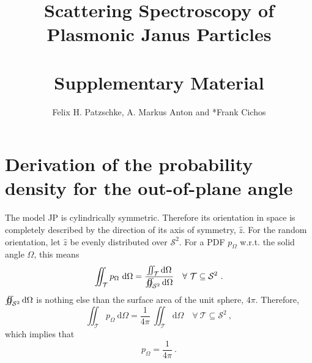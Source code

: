 \documentclass[10pt]{article}
\title{\sffamily\bfseries\color{MidnightBlue} Scattering Spectroscopy of\\Plasmonic Janus Particles\\\mbox{ }\\Supplementary Material}
\author{Felix H. Patzschke, A. Markus Anton and *Frank Cichos}
\date{}
\begin{document}

\maketitle

\sectionfont{\sffamily\color{MidnightBlue}}  %
\subsectionfont{\sffamily\color{MidnightBlue}}  %



\section*{Derivation of the probability density for the out-of-plane angle}

The model JP is cylindrically symmetric. Therefore its orientation in space is completely described by the direction of its axis of symmetry, $\hat{z}$. 
For the random orientation, let $\hat{z}$ be evenly distributed over $\mathcal{S}^2$. 
For a PDF $p_\Omega$ w.r.t. the solid angle $\Omega$, this means
$$
\iint_{\mathcal{T}} p_\Omega \ \mathrm{d}\Omega
=
\frac{
\iint_{\mathcal{T}} \mathrm{d}\Omega
}{
\varoiint_{\mathcal{S}^2} \mathrm{d}\Omega
}
\quad\forall\ \mathcal{T}\subseteq\mathcal{S}^2
\ .
$$
$\varoiint_{\mathcal{S}^2} \mathrm{d}\Omega$ is nothing else than the surface area of the unit sphere, $4\pi$. 
Therefore, 
$$
\iint_{\mathcal{T}} p_\Omega \ \mathrm{d}\Omega
=
\frac{1}{4\pi}\ 
\iint_{\mathcal{T}} \mathrm{d}\Omega
\quad\forall\ \mathcal{T}\subseteq\mathcal{S}^2
\ ,
$$
which implies that
$$
p_\Omega=\frac{1}{4\pi}\ .
$$
\end{document}
